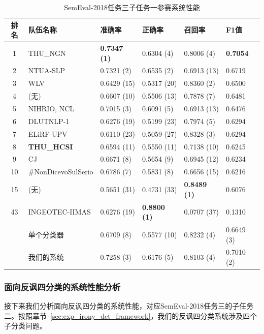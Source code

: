 \begin{table}[htb]
  \centering
  \begin{minipage}[t]{\linewidth}
  \caption{SemEval-2018任务三子任务一参赛系统性能} %
  \label{tab:exp_irony_det_A_other_comp}
    \begin{tabularx}{\linewidth}{c|X|llll}
    \toprule[1.5pt]
    排名 & 队伍名称 & 准确率 & 正确率 & 召回率 & F1值 \\
    \hline 
    1 & THU\_NGN & \bf 0.7347 (1) & 0.6304 (4) & 0.8006 (4) & \bf 0.7054 \\
    2 & NTUA-SLP & 0.7321 (2) & 0.6535 (2) & 0.6913 (13) & 0.6719 \\
    3 & WLV & 0.6429 (15) & 0.5317 (20) & 0.8360 (2) & 0.6500 \\
    4 & (无) & 0.6607 (10) & 0.5506 (13) & 0.7878 (7) & 0.6481 \\
    5 & NIHRIO, NCL & 0.7015 (3) & 0.6091 (5) & 0.6913 (13) & 0.6476 \\
    6 & DLUTNLP-1 & 0.6276 (19) & 0.5199 (23) & 0.7974 (5) & 0.6294 \\
    7 & ELiRF-UPV & 0.6110 (23) & 0.5059 (27) & 0.8328 (3) & 0.6294 \\
    8 & \bf THU\_HCSI & 0.6594 (11) & 0.5550 (11) & 0.7138 (10) & 0.6245 \\
    9 & CJ & 0.6671 (8) & 0.5654 (9) & 0.6945 (12) & 0.6234 \\ 
    10 & \#NonDicevoSulSerio & 0.6786 (7) & 0.5831 (8) & 0.6656 (15) & 0.6216 \\
    \hline
    15 & (无) & 0.5651 (31) & 0.4731 (33) & \bf 0.8489 (1) & 0.6076 \\
    \hline
    43 & INGEOTEC-IIMAS & 0.6276 (19) & \bf 0.8800 (1) & 0.0707 (37) & 0.1310 \\
    \hline 
    & 单个分类器 & 0.6709 (8) & 0.5577 (10) & 0.8232 (4) & 0.6649 (3) \\ %
    & 我们的系统 & 0.7258 (3) & 0.6176 (5) & 0.8103 (4) & 0.7010 (2) \\
    \bottomrule[1.5pt]
    \end{tabularx}
  \end{minipage}
\end{table}

\subsubsection{面向反讽四分类的系统性能分析}

接下来我们分析面向反讽四分类的系统性能，对应SemEval-2018任务三的子任务二。按照章节~\ref{sec:exp_irony_det_framework}，我们的反讽四分类系统涉及四个子分类问题。

